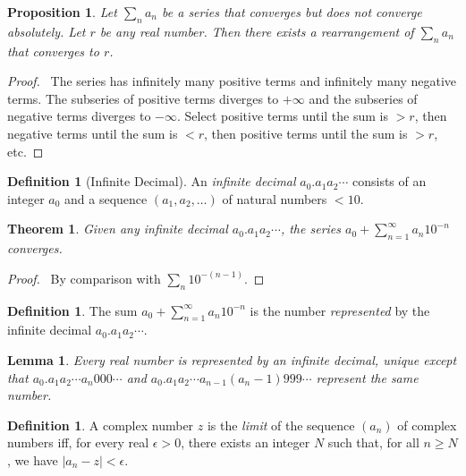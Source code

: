 \documentclass{article}
\let\qed\relax
\newtheorem{lemma}[axiom]{Lemma}
\newtheorem{proposition}[axiom]{Proposition}
\newtheorem{theorem}[axiom]{Theorem}
\theoremstyle{definition}
\newtheorem{definition}[axiom]{Definition}
\begin{document}
\begin{proposition}
    Let $\sum_n a_n$ be a series that converges but does not converge absolutely. Let $r$ be any real number. Then there exists a
    rearrangement of $\sum_n a_n$ that converges to $r$.
\end{proposition}

\begin{proof}
    \pf\ The series has infinitely many positive terms and infinitely many negative terms. The subseries of positive terms diverges to
    $+ \infty$ and the subseries of negative terms diverges to $- \infty$. Select positive terms until the sum is $>r$, then
    negative terms until the sum is $< r$, then positive terms until the sum is $> r$, etc. \qed
\end{proof}

\begin{definition}[Infinite Decimal]
    An \emph{infinite decimal} $a_0 . a_1 a_2 \cdots$ consists of an integer $a_0$ and a sequence $(a_1, a_2, \ldots)$ of natural numbers
    $< 10$.
\end{definition}

\begin{theorem}
    Given any infinite decimal $a_0 . a_1 a_2 \cdots$, the series $a_0 + \sum_{n=1}^\infty a_n 10^{-n}$ converges.
\end{theorem}

\begin{proof}
    \pf\ By comparison with $\sum_n 10^{-(n-1)}$. \qed
\end{proof}

\begin{definition}
    The sum $a_0 + \sum_{n=1}^\infty a_n 10^{-n}$ is the number \emph{represented} by the infinite decimal $a_0 . a_1 a_2 \cdots$.
\end{definition}

\begin{lemma}
    Every real number is represented by an infinite decimal, unique except that $a_0 . a_1 a_2 \cdots a_n 0 0 0 \cdots$ and
    $a_0 . a_1 a_2 \cdots a_{n-1} (a_n - 1) 9 9 9 \cdots$ represent the same number.
\end{lemma}

\begin{definition}
    A complex number $z$ is the \emph{limit} of the sequence $(a_n)$ of complex
    numbers iff, for every real $\epsilon > 0$, there exists an integer $N$ such that,
    for all $n \geq N$, we have $|a_n - z| < \epsilon$.
\end{definition}
\end{document}
